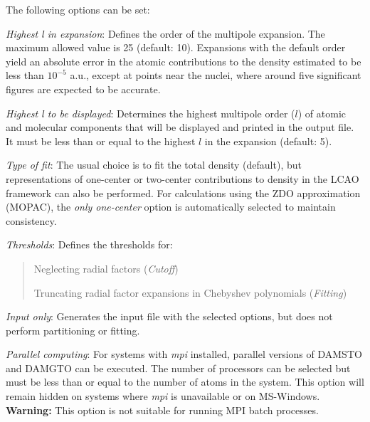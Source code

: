 \documentclass[10pt]{article}
\begin{document}
The following options can be set:

\begingroup
\renewcommand{\labelitemi}{$-$}
\begin{itemize}
\item {\it Highest l in expansion}: Defines the order of the multipole expansion.
The maximum allowed value is 25 (default: 10).
Expansions with the default order yield an absolute error in the atomic contributions
to the density estimated to be less than $10^{-5}$ a.u., except at points near the nuclei,
where around five significant figures are expected to be accurate.

\item {\it Highest l to be displayed}: Determines the highest multipole order ($l$)
of atomic and molecular components that will be displayed and printed in the output file.
It must be less than or equal to the highest $l$ in the expansion (default: 5).

\item {\it Type of fit}: The usual choice is to fit the total density (default),
but representations of one-center or two-center contributions to density
in the LCAO framework can also be performed.
For calculations using the ZDO approximation (MOPAC), the {\it only one-center} option
is automatically selected to maintain consistency.

\item {\it Thresholds}:
Defines the thresholds for:
\vspace*{-5mm}
\begin{quote}
\item Neglecting radial factors ({\it Cutoff})
\item Truncating radial factor expansions in Chebyshev polynomials ({\it Fitting})
\end{quote}

\item {\it Input only}:
Generates the input file with the selected options,
but does not perform partitioning or fitting.

\item {\it Parallel computing}:
For systems with {\it mpi} installed, parallel versions of DAMSTO and DAMGTO can be executed.
The number of processors can be selected but must be less than or equal to the number of atoms in the system.
This option will remain hidden on systems where {\it mpi} is unavailable or on MS-Windows.
{\bf Warning:} This option is not suitable for running MPI batch processes.
\end{itemize}
\endgroup
\end{document}
